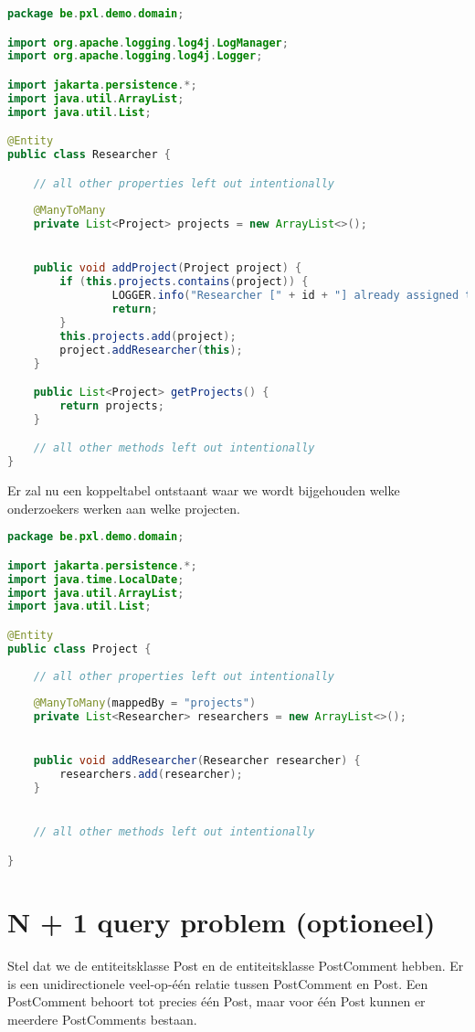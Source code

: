 \begin{lstlisting}[frame=single,language=java]
package be.pxl.demo.domain;

import org.apache.logging.log4j.LogManager;
import org.apache.logging.log4j.Logger;

import jakarta.persistence.*;
import java.util.ArrayList;
import java.util.List;

@Entity
public class Researcher {

	// all other properties left out intentionally
	
	@ManyToMany
	private List<Project> projects = new ArrayList<>();


	public void addProject(Project project) {
		if (this.projects.contains(project)) {
				LOGGER.info("Researcher [" + id + "] already assigned to [" + project.getName() + "]");
				return;
		}
		this.projects.add(project);
		project.addResearcher(this);
	}

	public List<Project> getProjects() {
		return projects;
	}

	// all other methods left out intentionally
}
\end{lstlisting}

Er zal nu een koppeltabel ontstaant waar we wordt bijgehouden welke onderzoekers werken aan welke projecten.

\begin{lstlisting}[frame=single,language=java]
package be.pxl.demo.domain;

import jakarta.persistence.*;
import java.time.LocalDate;
import java.util.ArrayList;
import java.util.List;

@Entity
public class Project {
	
	// all other properties left out intentionally
	
	@ManyToMany(mappedBy = "projects")
	private List<Researcher> researchers = new ArrayList<>();


	public void addResearcher(Researcher researcher) {
		researchers.add(researcher);
	}


	// all other methods left out intentionally

}
\end{lstlisting}


\section{N + 1 query problem (optioneel)}

Stel dat we de entiteitsklasse Post en de entiteitsklasse PostComment hebben. Er is een unidirectionele veel-op-één relatie tussen PostComment en Post. Een PostComment behoort tot precies één Post, maar voor één Post kunnen er meerdere PostComments bestaan.

